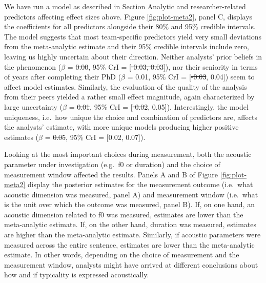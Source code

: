 \documentclass[Review,times,sageh]{sagej}
\providecommand{\DIFaddtex}[1]{{\protect\color{blue}\uwave{#1}}} %
\providecommand{\DIFdeltex}[1]{{\protect\color{red}\sout{#1}}}                      %
\providecommand{\DIFaddbegin}{} %
\providecommand{\DIFaddend}{} %
\providecommand{\DIFdelbegin}{} %
\providecommand{\DIFdelend}{} %
\providecommand{\DIFadd}[1]{\texorpdfstring{\DIFaddtex{#1}}{#1}} %
\providecommand{\DIFdel}[1]{\texorpdfstring{\DIFdeltex{#1}}{}} %
\begin{document}
We have run a model as described in Section Analytic and researcher-related predictors affecting effect sizes above.
Figure \ref{fig:plot-meta2}, panel C, displays the coefficients for all predictors alongside their 80\% and 95\% credible intervals.
The model suggests that most team-specific predictors yield very small deviations from the meta-analytic estimate and their 95\% credible intervals include zero, leaving us highly uncertain about their direction.
Neither analysts' prior beliefs in the phenomenon (\(\beta\) = \DIFdelbegin \DIFdel{0.00}\DIFdelend \DIFaddbegin \DIFadd{-0.01}\DIFaddend , 95\% CrI = {[}\DIFdelbegin \DIFdel{-0.03, 0.03}\DIFdelend \DIFaddbegin \DIFadd{-0.04, 0.01}\DIFaddend {]}), nor their seniority in terms of years after completing their PhD (\(\beta\) = 0.01, 95\% CrI = {[}\DIFdelbegin \DIFdel{-0.03}\DIFdelend \DIFaddbegin \DIFadd{-0.02}\DIFaddend , 0.04{]}) seem to affect model estimates.
Similarly, the evaluation of the quality of the analysis from their peers yielded a rather small effect magnitude, again characterized by large uncertainty (\(\beta\) = \DIFdelbegin \DIFdel{0.01}\DIFdelend \DIFaddbegin \DIFadd{0.02}\DIFaddend , 95\% CrI = {[}\DIFdelbegin \DIFdel{-0.02}\DIFdelend \DIFaddbegin \DIFadd{-0.01}\DIFaddend , 0.05{]}).
Interestingly, the model uniqueness, i.e.~how unique the choice and combination of predictors are, affects the analysts' estimate, with more unique models producing higher positive estimates (\(\beta\) = \DIFdelbegin \DIFdel{0.05}\DIFdelend \DIFaddbegin \DIFadd{0.04}\DIFaddend , 95\% CrI = {[}0.02, 0.07{]}).

Looking at the most important choices during measurement, both the acoustic parameter under investigation (e.g.~f0 or duration) and the choice of measurement window affected the results.
Panels A and B of Figure \ref{fig:plot-meta2} display the posterior estimates for the measurement outcome (i.e.~what acoustic dimension was measured, panel A) and measurement window (i.e.~what is the unit over which the outcome was measured, panel B).
If, on one hand, an acoustic dimension related to f0 was measured, estimates are lower than the meta-analytic estimate.
If, on the other hand, duration was measured, estimates are higher than the meta-analytic estimate.
Similarly, if acoustic parameters were measured across the entire sentence, estimates are lower than the meta-analytic estimate.
In other words, depending on the choice of measurement and the measurement window, analysts might have arrived at different conclusions about how and if typicality is expressed acoustically.
\end{document}
